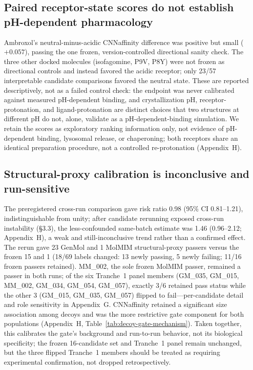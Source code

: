 \documentclass{article}
\begin{document}
\subsection{Paired receptor-state scores do not establish pH-dependent pharmacology}

Ambroxol's neutral-minus-acidic CNNaffinity difference was positive but small ($+0.057$), passing the one frozen, version-controlled directional sanity check. The three other docked molecules (isofagomine, P9V, P8Y) were not frozen as directional controls and instead favored the acidic receptor; only 23/57 interpretable candidate comparisons favored the neutral state. These are reported descriptively, not as a failed control check: the endpoint was never calibrated against measured pH-dependent binding, and crystallization pH, receptor-protonation, and ligand-protonation are distinct choices that two structures at different pH do not, alone, validate as a pH-dependent-binding simulation. We retain the scores as exploratory ranking information only, not evidence of pH-dependent binding, lysosomal release, or chaperoning; both receptors share an identical preparation procedure, not a controlled re-protonation (Appendix~H).

\subsection{Structural-proxy calibration is inconclusive and run-sensitive}

The preregistered cross-run comparison gave risk ratio 0.98 (95\% CI 0.81--1.21), indistinguishable from unity; after candidate rerunning exposed cross-run instability (\S3.3), the less-confounded same-batch estimate was 1.46 (0.96--2.12; Appendix~H), a weak and still-inconclusive trend rather than a confirmed effect. The rerun gave 23 GenMol and 1 MolMIM structural-proxy passers versus the frozen 15 and 1 (18/69 labels changed: 13 newly passing, 5 newly failing; 11/16 frozen passers retained). MM\_002, the sole frozen MolMIM passer, remained a passer in both runs; of the six Tranche~1 panel members (GM\_035, GM\_015, MM\_002, GM\_034, GM\_054, GM\_057), exactly 3/6 retained pass status while the other 3 (GM\_015, GM\_035, GM\_057) flipped to fail---per-candidate detail and role sensitivity in Appendix~G. CNNaffinity retained a significant size association among decoys and was the more restrictive gate component for both populations (Appendix~H, Table~\ref{tab:decoy-gate-mechanism}). Taken together, this calibrates the gate's background and run-to-run behavior, not its biological specificity; the frozen 16-candidate set and Tranche~1 panel remain unchanged, but the three flipped Tranche~1 members should be treated as requiring experimental confirmation, not dropped retrospectively.
\end{document}
